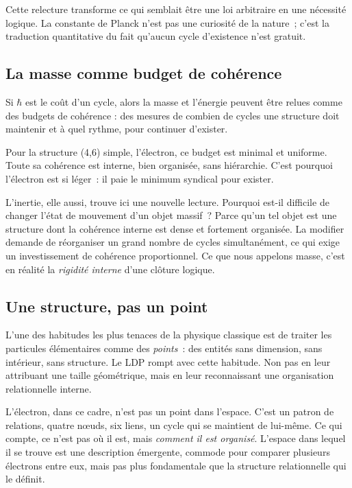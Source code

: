 \documentclass[12pt, a4paper, openright]{book}
\begin{document}
\medskip

Cette relecture transforme ce qui semblait être une loi arbitraire en une nécessité logique. La constante de Planck n'est pas une curiosité de la nature~; c'est la traduction quantitative du fait qu'aucun cycle d'existence n'est gratuit.

\subsection*{La masse comme budget de cohérence}

Si $\hbar$ est le coût d'un cycle, alors la masse et l'énergie peuvent être relues comme des budgets de cohérence : des mesures de combien de cycles une structure doit maintenir et à quel rythme, pour continuer d'exister.

\medskip

Pour la structure (4,6) simple, l'électron, ce budget est minimal et uniforme. Toute sa cohérence est interne, bien organisée, sans hiérarchie. C'est pourquoi l'électron est si léger~: il paie le minimum syndical pour exister.

\medskip

L'inertie, elle aussi, trouve ici une nouvelle lecture. Pourquoi est-il difficile de changer l'état de mouvement d'un objet massif~? Parce qu'un tel objet est une structure dont la cohérence interne est dense et fortement organisée. La modifier demande de réorganiser un grand nombre de cycles simultanément, ce qui exige un investissement de cohérence proportionnel. Ce que nous appelons masse, c'est en réalité la \emph{rigidité interne} d'une clôture logique.

\subsection*{Une structure, pas un point}

L'une des habitudes les plus tenaces de la physique classique est de traiter les particules élémentaires comme des \emph{points}~: des entités sans dimension, sans intérieur, sans structure. Le LDP rompt avec cette habitude. Non pas en leur attribuant une taille géométrique, mais en leur reconnaissant une organisation relationnelle interne.

\medskip

L'électron, dans ce cadre, n'est pas un point dans l'espace. C'est un patron de relations, quatre n\oe{}uds, six liens, un cycle qui se maintient de lui-même. Ce qui compte, ce n'est pas où il est, mais \emph{comment il est organisé}. L'espace dans lequel il se trouve est une description émergente, commode pour comparer plusieurs électrons entre eux, mais pas plus fondamentale que la structure relationnelle qui le définit.
\end{document}
